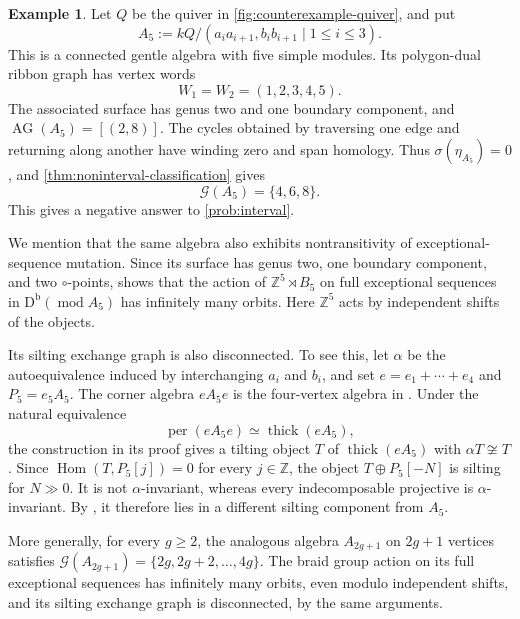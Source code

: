 \documentclass[11pt]{amsart}
\theoremstyle{definition}
\theoremstyle{plain}
\theoremstyle{definition}
\newtheorem{example}[example]{Example}
\theoremstyle{definition}
\newcommand{\Db}{\mathrm D^{\mathrm b}}
\newcommand{\per}{\operatorname{per}}
\newcommand{\modu}{\operatorname{mod}}
\newcommand{\thick}{\operatorname{thick}}
\newcommand{\Hom}{\operatorname{Hom}}
\newcommand{\AG}{\operatorname{AG}}
\newcommand{\GSpec}{\mathcal G}
\newcommand{\ZZ}{\mathbb Z}
\begin{document}
\begin{example}
\label{thm:intro-counterexample}
Let $Q$ be the quiver in
\cref{fig:counterexample-quiver}, and put
\[
  A_5
  :=kQ/(a_i a_{i+1},b_i b_{i+1}\mid1\leq i\leq3).
\]
This is a connected gentle algebra with five simple modules.
Its polygon-dual ribbon graph has vertex words
\[
  W_1=W_2=(1,2,3,4,5).
\]
The associated surface has genus two and one boundary
component, and $\AG(A_5)=[(2,8)]$.
The cycles obtained by traversing one edge and returning
along another have winding zero and span homology.
Thus $\sigma(\eta_{A_5})=0$, and
\cref{thm:noninterval-classification} gives
\begin{equation}
\label{eq:intro-counterexample}
  \GSpec(A_5)=\{4,6,8\}.
\end{equation}
This gives a negative answer to \cref{prob:interval}.

We mention that the same algebra also exhibits nontransitivity of
exceptional-sequence mutation.
Since its surface has genus two, one boundary component,
and two $\circ$-points,
\cite[Theorem~5.4]{ChangHaidenSchroll} shows that the action
of $\ZZ^5\rtimes B_5$ on full exceptional sequences in
$\Db(\modu A_5)$ has infinitely many orbits.
Here $\ZZ^5$ acts by independent shifts of the objects.

Its silting exchange graph is also disconnected.
To see this, let $\alpha$ be the autoequivalence induced
by interchanging $a_i$ and $b_i$, and set
$e=e_1+\cdots+e_4$ and $P_5=e_5A_5$.
The corner algebra $eA_5 e$ is the four-vertex
algebra in \cite[Proposition~4.4]{Dugas}.
Under the natural equivalence
\[
  \per(eA_5 e)\simeq\thick(eA_5),
\]
the construction in its proof gives a tilting object
$T$ of $\thick(eA_5)$ with $\alpha T\not\cong T$.
Since $\Hom(T,P_5[j])=0$ for every $j\in\ZZ$,
the object $T\oplus P_5[-N]$ is silting for $N\gg0$.
It is not $\alpha$-invariant, whereas every indecomposable
projective is $\alpha$-invariant.
By \cite[Corollary~2.2]{Dugas}, it therefore lies in a
different silting component from $A_5$.

More generally, for every $g\geq2$, the analogous algebra
$A_{2g+1}$ on $2g+1$ vertices satisfies
$\GSpec(A_{2g+1})=\{2g,2g+2,\ldots,4g\}$.
The braid group action on its full exceptional sequences
has infinitely many orbits, even modulo independent shifts,
and its silting exchange graph is disconnected, by the
same arguments.
\end{example}
\end{document}
